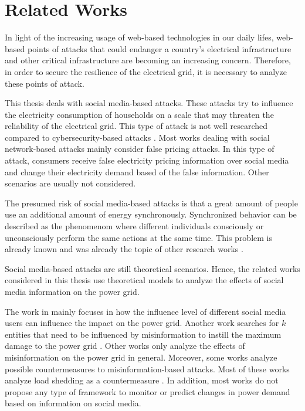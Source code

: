 \chapter{Related Works}
\label{relatedworks}
In light of the increasing usage of web-based technologies in our daily 
lifes, web-based points of attacks that could endanger a country's 
electrical infrastructure and other critical infrastructure 
are becoming an increasing concern.
Therefore, in order to secure the resilience of the electrical grid,
it is necessary to analyze these points of attack.

This thesis deals with social media-based
attacks. These attacks try to 
influence the electricity consumption of households 
on a scale that may threaten the reliability
of the electrical grid. 
This type of attack is not well researched compared to
cybersecurity-based attacks
\cite{sun2018cyber}. 
Most works dealing with social network-based
attacks mainly consider false pricing attacks. In this type of attack, 
consumers receive false 
electricity pricing information over social media and change their 
electricity demand based of the false information.
Other scenarios are usually not considered.

The presumed risk of social media-based attacks is that a 
great amount of people
use an additional amount of energy synchronously.
Synchronized behavior can be described 
as the phenomenom where different individuals
consciously or unconsciously
perform the same actions at the same time.
This problem is already known and was
already the topic of other research works
\cite{lei2014impact} \cite{walker2014dynamics}
\cite{gebhard2022monitoring}.

Social media-based attacks are still theoretical scenarios.
Hence, the related works considered in this thesis use theoretical
models to analyze the effects of social media information
on the power grid.

The work in \cite{vulnerabilityanalysis} mainly focuses in how the influence 
level of different social media users can influence the 
impact on the power grid. Another work
searches for $k$ entities that
need to be influenced by misinformation to instill 
the maximum damage to the power grid \cite{pan2017threat}.
Other works only analyze the 
effects of misinformation on the power grid
in general.
Moreover, some works analyze possible countermeasures to misinformation-based
attacks. Most of these works analyze load shedding as a 
countermeasure \cite{pan2017threat} \cite{nguyen2019vulnerability}.
In addition, most works do not propose any type of framework to 
monitor or predict changes in power demand based on 
information on social media.

